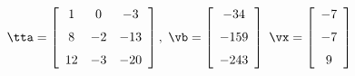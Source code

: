 {$\tta = \left[ \begin {array}{ccc} 1&0&-3\\\noalign{\medskip}8&-2&-13
\\\noalign{\medskip}12&-3&-20\end {array} \right],$
 \quad
$\vb = \left[ \begin {array}{c} -34\\\noalign{\medskip}-159
\\\noalign{\medskip}-243\end {array} \right]$ 
}
{$\vx = \left[ \begin {array}{c} -7\\\noalign{\medskip}-7\\\noalign{\medskip}
9\end {array} \right] $}
